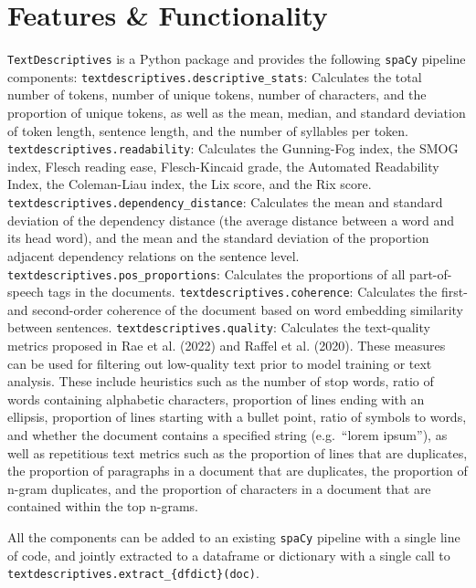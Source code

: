 \documentclass[
]{article}
\begin{document}
\hypertarget{features-functionality}{%
\section{Features \& Functionality}\label{features-functionality}}

\texttt{TextDescriptives} is a Python package and provides the following
\texttt{spaCy} pipeline components:
\texttt{textdescriptives.descriptive\_stats}: Calculates the total
number of tokens, number of unique tokens, number of characters, and the
proportion of unique tokens, as well as the mean, median, and standard
deviation of token length, sentence length, and the number of syllables
per token. \texttt{textdescriptives.readability}: Calculates the
Gunning-Fog index, the SMOG index, Flesch reading ease, Flesch-Kincaid
grade, the Automated Readability Index, the Coleman-Liau index, the Lix
score, and the Rix score.
\texttt{textdescriptives.dependency\_distance}: Calculates the mean and
standard deviation of the dependency distance (the average distance
between a word and its head word), and the mean and the standard
deviation of the proportion adjacent dependency relations on the
sentence level. \texttt{textdescriptives.pos\_proportions}: Calculates
the proportions of all part-of-speech tags in the documents.
\texttt{textdescriptives.coherence}: Calculates the first- and
second-order coherence of the document based on word embedding
similarity between sentences. \texttt{textdescriptives.quality}:
Calculates the text-quality metrics proposed in Rae et al. (2022) and
Raffel et al. (2020). These measures can be used for filtering out
low-quality text prior to model training or text analysis. These include
heuristics such as the number of stop words, ratio of words containing
alphabetic characters, proportion of lines ending with an ellipsis,
proportion of lines starting with a bullet point, ratio of symbols to
words, and whether the document contains a specified string
(e.g.~``lorem ipsum''), as well as repetitious text metrics such as the
proportion of lines that are duplicates, the proportion of paragraphs in
a document that are duplicates, the proportion of n-gram duplicates, and
the proportion of characters in a document that are contained within the
top n-grams.

All the components can be added to an existing \texttt{spaCy} pipeline
with a single line of code, and jointly extracted to a dataframe or
dictionary with a single call to
\texttt{textdescriptives.extract\_\{df\textbar{}dict\}(doc)}.
\end{document}

